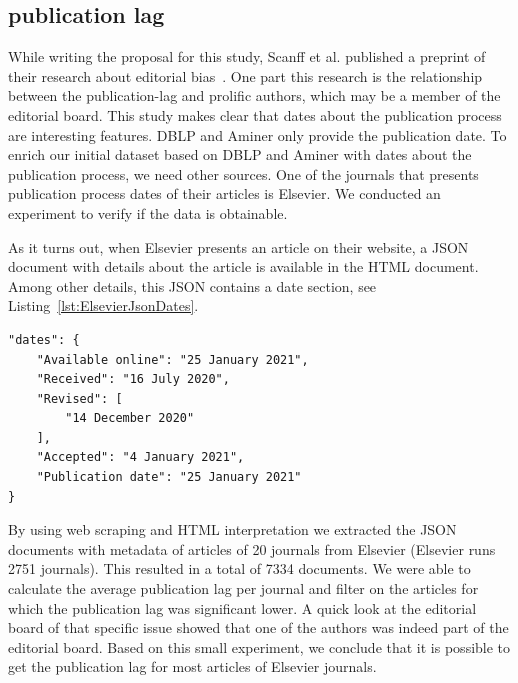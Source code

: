 \documentclass{ou-report}
\begin{document}
\subsection{publication lag}
While writing the proposal for this study, Scanff et al. published a preprint of 
their research about editorial bias~\cite{SNCMBL2021}. One part this research is 
the relationship between the publication-lag and prolific authors, which may be 
a member of the editorial board. This study makes clear that dates about the 
publication process are interesting features. DBLP and Aminer only provide the 
publication date. To enrich our initial dataset based on DBLP and Aminer with 
dates about the publication process, we need other sources. One of the journals 
that presents publication process dates of their articles is Elsevier. We 
conducted an experiment to verify if the data is obtainable.

As it turns out, when Elsevier presents an article on their website, a JSON 
document with details about the article is available in the HTML document. Among 
other details, this JSON contains a date section, see 
Listing~\ref{lst:ElsevierJsonDates}.

\begin{lstlisting}[caption={Dates in the JSON document},label={lst:ElsevierJsonDates}]
"dates": {
    "Available online": "25 January 2021",
    "Received": "16 July 2020",
    "Revised": [
        "14 December 2020"
    ],
    "Accepted": "4 January 2021",
    "Publication date": "25 January 2021"
}
\end{lstlisting}

By using web scraping and HTML interpretation we extracted the JSON documents 
with metadata of articles of 20 journals from Elsevier (Elsevier runs 2751 
journals). This resulted in a total of 7334 documents. We were able to calculate 
the average publication lag per journal and filter on the articles for which the 
publication lag was significant lower. A quick look at the editorial board of 
that specific issue showed that one of the authors was indeed part of the 
editorial board. Based on this small experiment, we conclude that it is 
possible to get the publication lag for most articles of Elsevier journals.
\end{document}
